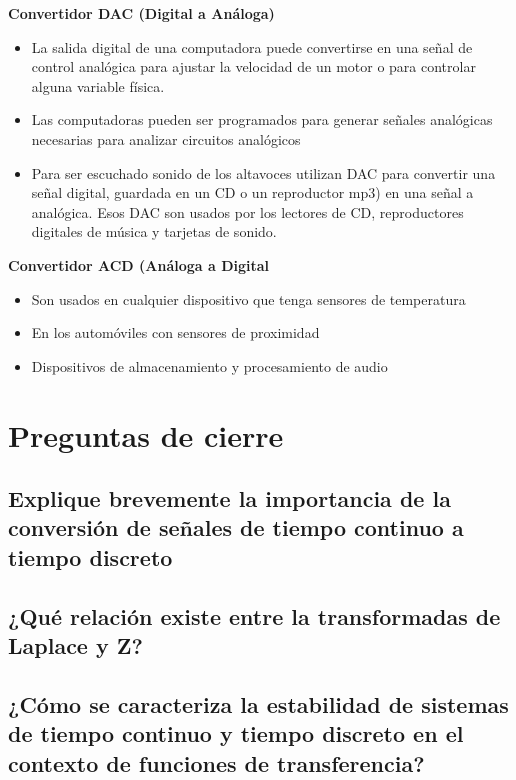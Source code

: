 	\textbf{Convertidor DAC (Digital a Análoga)}
	\begin{itemize}
		\item La salida digital de una computadora puede convertirse en una señal de control analógica para ajustar la velocidad de un motor o para controlar alguna variable física.
		\item Las computadoras pueden ser programados para generar señales analógicas necesarias para analizar circuitos analógicos
		\item Para ser escuchado sonido de los altavoces utilizan DAC para convertir una señal digital, guardada en un CD o un reproductor mp3) en una señal a analógica. Esos DAC son usados por los lectores de CD, reproductores digitales de música y tarjetas de sonido.
	\end{itemize}
	
	\textbf{Convertidor ACD (Análoga a Digital}
	\begin{itemize}
		\item Son usados en cualquier dispositivo que tenga sensores de temperatura
		\item En los automóviles con sensores de proximidad
		\item Dispositivos de almacenamiento y procesamiento de audio
	\end{itemize}
	

\section{Preguntas de cierre}

\subsection{Explique brevemente la importancia de la conversión de señales de tiempo continuo a tiempo discreto}
\subsection{¿Qué relación existe entre la transformadas de Laplace y Z?}
\subsection{¿Cómo se caracteriza la estabilidad de sistemas de tiempo continuo y tiempo discreto en el contexto de funciones de transferencia?}